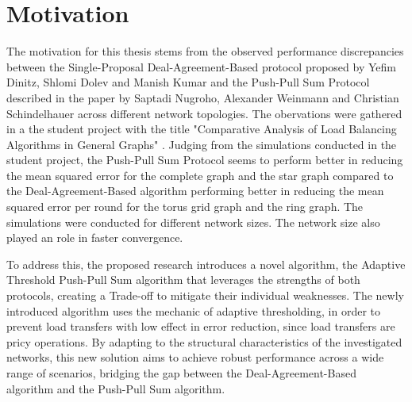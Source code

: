
\section{Motivation}\label{sec:motivation}
The motivation for this thesis stems from the observed performance discrepancies between the Single-Proposal Deal-Agreement-Based protocol proposed by Yefim Dinitz, Shlomi Dolev and Manish Kumar \cite{Dinitz2023DAB} and the Push-Pull Sum Protocol described in the paper by Saptadi Nugroho, Alexander Weinmann and Christian Schindelhauer \cite{nugroho2023PushPullSumDataAg} across different network topologies. The obervations were gathered in a the student project with the title "Comparative Analysis of Load Balancing Algorithms in General Graphs" \cite{Bayazitoglu}. Judging from the simulations conducted in the student project, the Push-Pull Sum Protocol seems to perform better in reducing the mean squared error for the complete graph and the star graph compared to the Deal-Agreement-Based algorithm performing better in reducing the mean squared error per round for the torus grid graph and the ring graph. The simulations were conducted for different network sizes. The network size also played an role in faster convergence.

To address this, the proposed research introduces a novel algorithm, the Adaptive Threshold Push-Pull Sum algorithm that leverages the strengths of both protocols, creating a Trade-off to mitigate their individual weaknesses. The newly introduced algorithm uses the mechanic of adaptive thresholding, in order to prevent load transfers with low effect in error reduction, since load transfers are pricy operations. By adapting to the structural characteristics of the investigated networks, this new solution aims to achieve robust performance across a wide range of scenarios, bridging the gap between the Deal-Agreement-Based algorithm and the Push-Pull Sum algorithm.



